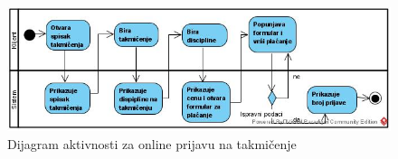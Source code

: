 \documentclass[../../main.tex]{subfiles}
\begin{document}
\begin{figure}[!ht]
\begin{center}
\includegraphics[scale=0.55]{sections/images/dijagram_aktivnosti_online_prijava_tamicenje.jpg}
\end{center}
\caption{Dijagram aktivnosti za online prijavu na takmičenje}
\label{fig:kontekst}
\end{figure}
\end{document}
